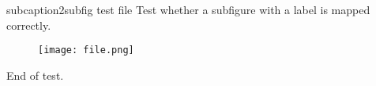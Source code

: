 subcaption2subfig test file
Test whether a subfigure with a label is mapped correctly.

\begin{subfigure}
    \label{fig:somelabl}
    \texttt{[image: file.png]}
\end{subfigure}

End of test.
